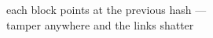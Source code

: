 \documentclass[preview]{standalone}
\begin{document}
\begin{center}
each block points at the previous hash ---\\tamper anywhere and the links shatter
\end{center}
\end{document}
